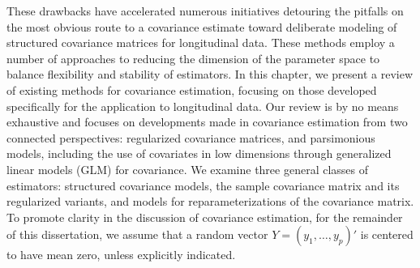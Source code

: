 These drawbacks have accelerated numerous initiatives detouring the pitfalls on the most obvious route to a covariance estimate toward deliberate modeling of structured covariance matrices for longitudinal data. These methods employ a number of approaches to reducing the dimension of the parameter space to balance flexibility and stability of estimators. In this chapter, we present a review of existing methods for covariance estimation, focusing on those developed specifically for the application to longitudinal data. Our review is by no means exhaustive and focuses on developments made in covariance estimation from two connected perspectives: regularized covariance matrices, and parsimonious models, including the use of covariates in low dimensions through generalized linear models (GLM) for covariance. We examine three general classes of estimators: structured covariance models, the sample covariance matrix and its regularized variants, and models for reparameterizations of the covariance matrix. To promote clarity in the discussion of covariance estimation, for the remainder of this dissertation, we assume that a random vector $Y = \left(y_1, \dots, y_p \right)'$ is centered to have mean zero, unless explicitly indicated.

\bigskip

%






